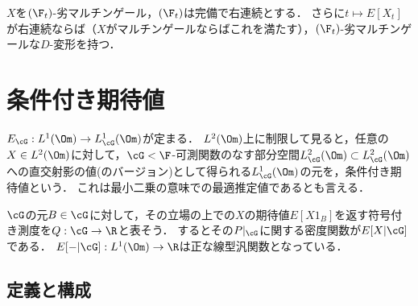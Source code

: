 \documentclass[uplatex,dvipdfmx]{jsreport}
\begin{document}
\begin{theorem}
    $X$を$(\F_t)$-劣マルチンゲール，$(\F_t)$は完備で右連続とする．
    さらに$t\mapsto E[X_t]$が右連続ならば（$X$がマルチンゲールならばこれを満たす），$(\F_t)$-劣マルチンゲールな$D$-変形を持つ．
\end{theorem}

\section{条件付き期待値}

\begin{tcolorbox}[colframe=ForestGreen, colback=ForestGreen!10!white,breakable,colbacktitle=ForestGreen!40!white,coltitle=black,fonttitle=\bfseries\sffamily,
title=]
    $E_\cG:L^1(\Om)\to L^1_\cG(\Om)$が定まる．
    $L^2(\Om)$上に制限して見ると，任意の$X\in L^2(\Om)$に対して，$\cG<\F$-可測関数のなす部分空間$L_\cG^2(\Om)\subset L_\cG^2(\Om)$への直交射影の値(のバージョン)として得られる$L_\cG^1(\Om)$の元を，条件付き期待値という．
    これは最小二乗の意味での最適推定値であるとも言える．
\end{tcolorbox}
\begin{tcolorbox}[colframe=ForestGreen, colback=ForestGreen!10!white,breakable,colbacktitle=ForestGreen!40!white,coltitle=black,fonttitle=\bfseries\sffamily,
    title=]
    $\cG$の元$B\in\cG$に対して，その立場の上での$X$の期待値$E[X1_B]$を返す符号付き測度を$Q:\cG\to\R$と表そう．
    するとその$P|_\cG$に関する密度関数が$E[X|\cG]$である．
    $E[-|\cG]:L^1(\Om)\to\R$は正な線型汎関数となっている．
\end{tcolorbox}

\subsection{定義と構成}
\end{document}
